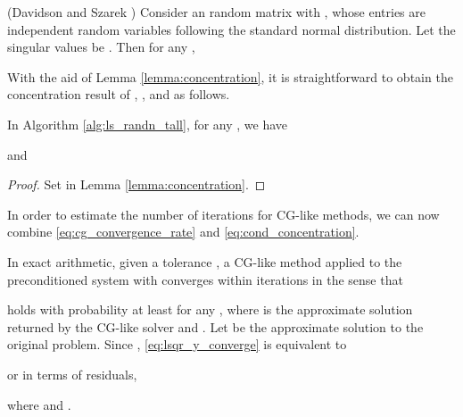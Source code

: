 \documentclass{siamltex}
\begin{document}
\begin{lemma} 
  \label{lemma:concentration}\textnormal{(Davidson and Szarek \cite{davidson2001local})} Consider an  random matrix
   with , whose entries are independent random variables following the
  standard normal distribution. Let the singular values be . Then for any ,
  
\end{lemma}

With the aid of Lemma \ref{lemma:concentration}, it is straightforward to 
obtain the concentration result of , , and 
 as follows.

\begin{theorem}
  \label{thm:cond_bound}
  In Algorithm \ref{alg:ls_randn_tall}, for any , we
  have
  
and 

\end{theorem}
\begin{proof}
  Set  in Lemma \ref{lemma:concentration}.
\end{proof}

In order to estimate the number of iterations for CG-like methods, we can now
combine \eqref{eq:cg_convergence_rate} and \eqref{eq:cond_concentration}.

\begin{theorem}
  \label{thm:iter}
  In exact arithmetic, given a tolerance , a CG-like method
  applied to the preconditioned system  with  converges within  iterations in the sense that
  
  holds with probability at least  for any , where  is the approximate solution
  returned by the CG-like solver and . Let  be the approximate solution to the original problem. Since
  , \eqref{eq:lsqr_y_converge} is equivalent to
  
  or in terms of residuals,
  
  where  and .
\end{theorem}
\end{document}
